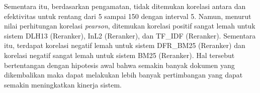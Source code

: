 Sementara itu, berdasarkan pengamatan, tidak ditemukan korelasi antara \cutoff{} dan efektivitas untuk rentang \cutoff{} dari 5 sampai 150 dengan interval 5. Namun, menurut nilai perhitungan korelasi \textit{pearson}, ditemukan korelasi positif sangat lemah untuk sistem DLH13 (Reranker), InL2 (Reranker), dan TF\_IDF (Reranker). Sementara itu, terdapat korelasi negatif lemah untuk sistem DFR\_BM25 (Reranker) dan korelasi negatif sangat lemah untuk sistem BM25 (Reranker). Hal tersebut bertentangan dengan hipotesis awal bahwa semakin banyak dokumen yang dikembalikan maka \lambdamart{} dapat melakukan lebih banyak pertimbangan yang dapat semakin meningkatkan kinerja sistem.









